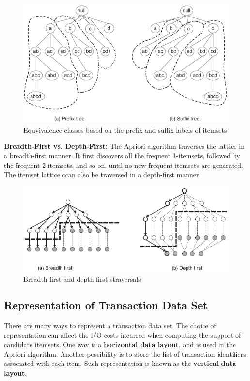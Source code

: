  			\begin{figure}[H]
 				\centering
 				\includegraphics[scale=0.36]{pics/equvivalence.png}
 				\caption{Equvivalence classes based on the prefix and suffix labels of itemsets}
 			\end{figure}

 		{\bf Breadth-First vs. Depth-First:} The Apriori algorithm traverses the lattice in a breadth-first
 		manner. It first discovers all the frequent 1-itemsets, followed by the frequent 2-itemsets,
 		and so on, until no new frequent itemsets are generated. The itemset lattice ccan also be
 		traversed in a depth-first manner.

 		\begin{figure}[H]
 				\centering
 				\includegraphics[scale=0.5]{pics/bfdf.png}
 				\caption{Breadth-first and depth-first straversals}
 		\end{figure}

 		\subsection{Representation of Transaction Data Set}

 			There are many ways to represent a transaction data set. The choice of representation can 
 			affect the I/O costs incurred when computing the support of candidate itemsets.
 			One way is a {\bf horizontal data layout}, and is used in the Apriori algorithm.
 			Another possibility is to store the list of transaction identifiers associated with
 			each item. Such representation is known as the {\bf vertical data layout}.

